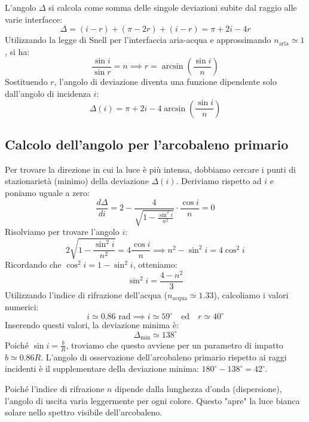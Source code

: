 \documentclass[openany,a4paper,12pt]{book}
\begin{document}
L'angolo $\Delta$ si calcola come somma delle singole deviazioni subite dal raggio alle varie interfacce:
\[
\Delta = (i - r) + (\pi - 2r) + (i - r) = \pi + 2i - 4r
\]
Utilizzando la legge di Snell per l'interfaccia aria-acqua e approssimando $n_{\text{aria}} \simeq 1$, si ha:
\begin{equation}
    \frac{\sin i}{\sin r} = n \implies r = \arcsin\left(\frac{\sin i}{n}\right)
\end{equation}
Sostituendo $r$, l'angolo di deviazione diventa una funzione dipendente solo dall'angolo di incidenza $i$:
\begin{equation}
   \Delta(i)  = \pi + 2i - 4\arcsin\left(\frac{\sin i}{n}\right)
\end{equation}

\subsection*{Calcolo dell'angolo per l'arcobaleno primario}
Per trovare la direzione in cui la luce è più intensa, dobbiamo cercare i punti di stazionarietà (minimo) della deviazione $\Delta(i)$. Deriviamo rispetto ad $i$ e poniamo uguale a zero:
\begin{equation}
    \frac{d \Delta}{d i} = 2 - \frac{4}{\sqrt{1 - \frac{\sin^2 i}{n^2}}} \cdot \frac{\cos i}{n} = 0
\end{equation}
Risolviamo per trovare l'angolo $i$:
\begin{equation}
    2\sqrt{1 - \frac{\sin^2 i}{n^2}} = 4 \frac{\cos i}{n} \implies n^2 - \sin^2 i = 4 \cos^2 i
\end{equation}
Ricordando che $\cos^2 i = 1 - \sin^2 i$, otteniamo:
\begin{equation}
     \sin^2 i = \frac{4 - n^2}{3}
\end{equation}
Utilizzando l'indice di rifrazione dell'acqua ($n_{\text{acqua}} \simeq 1.33$), calcoliamo i valori numerici:
\[
    i \simeq 0.86 \text{ rad} \implies i \simeq 59^\circ \quad \text{ed} \quad r \simeq 40^\circ
\]
Inserendo questi valori, la deviazione minima è:
\begin{equation}
    \Delta_{\text{min}} \simeq 138^\circ
\end{equation}
Poiché $\sin i = \frac{b}{R}$, troviamo che questo avviene per un parametro di impatto $b \simeq 0.86 R$.
L'angolo di osservazione dell'arcobaleno primario rispetto ai raggi incidenti è il supplementare della deviazione minima: $180^\circ - 138^\circ = 42^\circ$.

\begin{nota}
Poiché l'indice di rifrazione $n$ dipende dalla lunghezza d'onda (dispersione), l'angolo di uscita varia leggermente per ogni colore. Questo "apre" la luce bianca solare nello spettro visibile dell'arcobaleno.
\end{nota}
\end{document}
